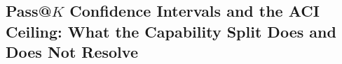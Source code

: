 %

\subsection{\texorpdfstring{Pass@$K$}{Pass@K} Confidence Intervals and the ACI Ceiling: What the Capability Split Does and Does Not Resolve}
\label{sec:scaling-passk-ci}

